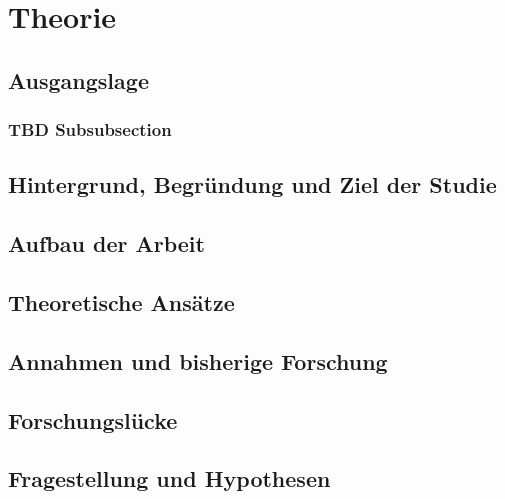 \section{Theorie}
\subsection{Ausgangslage}
\subsubsection{TBD Subsubsection}
\subsection{Hintergrund, Begründung und Ziel der Studie}
\subsection{Aufbau der Arbeit}
\subsection{Theoretische Ansätze}
\subsection{Annahmen und bisherige Forschung}
\subsection{Forschungslücke}
\subsection{Fragestellung und Hypothesen}